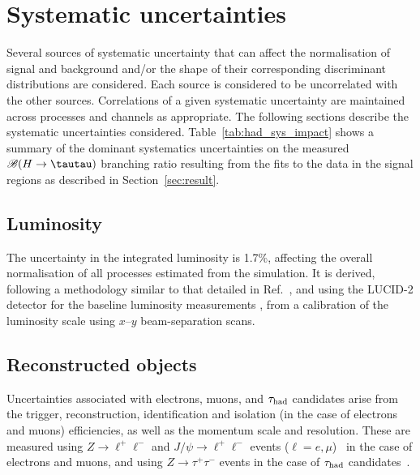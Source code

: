 \documentclass[PAPER, coverpage, atlasdraft=true, texlive=2016, UKenglish]{\ATLASLATEXPATH atlasdoc}
\providecommand{\DIFadd}[1]{{\protect\color{blue}\uwave{#1}}} %
\providecommand{\DIFdel}[1]{{\protect\color{red}\sout{#1}}}                      %
\providecommand{\DIFaddbegin}{} %
\providecommand{\DIFaddend}{} %
\providecommand{\DIFdelbegin}{} %
\providecommand{\DIFdelend}{} %
\begin{document}
\section{Systematic uncertainties}
\label{sec:systematics}

Several sources of systematic uncertainty that can affect the normalisation of signal 
and background and/or the shape of their corresponding discriminant distributions are considered.
Each source is considered to be uncorrelated with the other sources.  
Correlations of a given systematic uncertainty are maintained across processes and channels 
as appropriate. The following sections describe the systematic uncertainties considered.
Table~\ref{tab:had_sys_impact} shows a summary of the dominant systematics uncertainties on the measured \DIFdelbegin \DIFdel{$\BR(H\to \tautau)$ }\DIFdelend \DIFaddbegin \DIFadd{$\BR(H\to qH)$ }\DIFaddend branching ratio
resulting from the fits to the data in the signal regions as described in Section~\ref{sec:result}.

\subsection{Luminosity}
\label{sec:syst_lumi}

The uncertainty in the integrated luminosity is 1.7\%, affecting the overall normalisation of all processes estimated from the simulation. 
It is derived, following a methodology similar to that detailed in Ref.~\cite{Aaboud:2016hhf}, and using the LUCID-2 detector 
for the baseline luminosity measurements \cite{Avoni:2018iuv}, from a calibration of the luminosity scale using $x$--$y$ beam-separation scans.

\subsection{Reconstructed objects}
\label{sec:syst_objects}

Uncertainties associated with electrons, muons, and $\tau_{\mathrm{had}}$ candidates arise from the trigger, reconstruction,  
identification and isolation (in the case of electrons and muons) efficiencies, as well as the momentum scale and resolution. 
These are measured using $Z\to \ell^+\ell^-$ and $J/\psi\to \ell^+\ell^-$ events ($\ell =e, \mu$)~\cite{ATLAS-CONF-2016-024,Aad:2016jkr} 
in the case of electrons and muons, and using $Z\to \tau^+\tau^-$ events in the case of $\tau_{\mathrm{had}}$ candidates~\cite{ATLAS-CONF-2017-029}.
\end{document}
